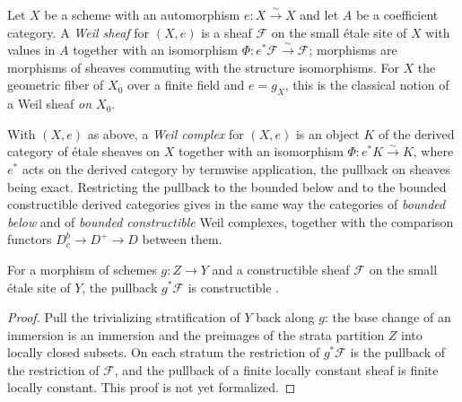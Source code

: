 \begin{definition}\label{def:weil-sheaf}
\leanok
Let \(X\) be a scheme with an automorphism \(e\colon X\xrightarrow{\sim}X\) and
let \(A\) be a coefficient category.  A \emph{Weil sheaf} for \((X,e)\) is a
sheaf \(\mathcal F\) on the small étale site of \(X\) with values in \(A\)
together with an isomorphism \(\Phi\colon e^*\mathcal F\xrightarrow{\sim}\mathcal
F\); morphisms are morphisms of sheaves commuting with the structure
isomorphisms.  For \(X\) the geometric fiber of \(X_0\) over a finite field and
\(e=g_X\), this is the classical notion of a Weil sheaf \emph{on \(X_0\)}.
\end{definition}

\begin{definition}\label{def:weil-complex-derived}
\leanok
With \((X,e)\) as above, a \emph{Weil complex} for \((X,e)\) is an object \(K\)
of the derived category of étale sheaves on \(X\) together with an isomorphism
\(\Phi\colon e^*K\xrightarrow{\sim}K\), where \(e^*\) acts on the derived
category by termwise application, the pullback on sheaves being exact.
Restricting the pullback to the bounded below and to the bounded constructible
derived categories gives in the same way the categories of \emph{bounded below}
and of \emph{bounded constructible} Weil complexes, together with the comparison
functors
\(D^b_c\to D^{+}\to D\) between them.
\end{definition}

\begin{lemma}
\label{lem:weil-constructible-sheaf-pullback}
For a morphism of schemes \(g\colon Z\to Y\) and a constructible sheaf
\(\mathcal F\) on the small étale site of \(Y\), the pullback \(g^*\mathcal F\) is
constructible \cite[Tag 03SB]{stacks-project}.
\end{lemma}
\begin{proof}
Pull the trivializing stratification of \(Y\) back along \(g\): the base change
of an immersion is an immersion and the preimages of the strata partition \(Z\)
into locally closed subsets.  On each stratum the restriction of \(g^*\mathcal F\)
is the pullback of the restriction of \(\mathcal F\), and the pullback of a finite
locally constant sheaf is finite locally constant.  This proof is not yet
formalized.
\end{proof}

